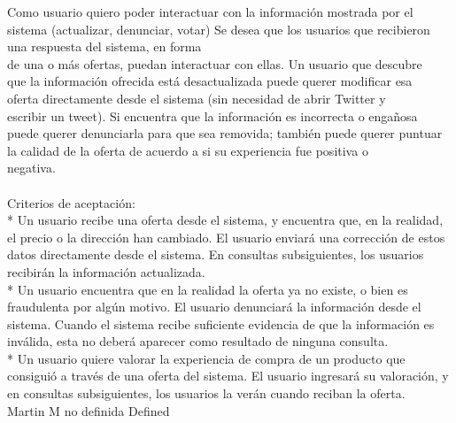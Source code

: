 	{Como usuario quiero poder interactuar con la información mostrada por el sistema (actualizar, denunciar, votar)} %
	{Se desea que los usuarios que recibieron una respuesta del sistema, en forma\\
de una o más ofertas, puedan interactuar con ellas. Un usuario que descubre\\
que la información ofrecida está desactualizada puede querer modificar esa\\
oferta directamente desde el sistema (sin necesidad de abrir Twitter y\\
escribir un tweet). Si encuentra que la información es incorrecta o engañosa\\
puede querer denunciarla para que sea removida; también puede querer puntuar\\
la calidad de la oferta de acuerdo a si su experiencia fue positiva o\\
negativa.\\
  \\
Criterios de aceptación:\\
* Un usuario recibe una oferta desde el sistema, y encuentra que, en la realidad, el precio o la dirección han cambiado. El usuario enviará una corrección de estos datos directamente desde el sistema. En consultas subsiguientes, los usuarios recibirán la información actualizada.  \\
* Un usuario encuentra que en la realidad la oferta ya no existe, o bien es fraudulenta por algún motivo. El usuario denunciará la información desde el sistema. Cuando el sistema recibe suficiente evidencia de que la información es inválida, esta no deberá aparecer como resultado de ninguna consulta.  \\
* Un usuario quiere valorar la experiencia de compra de un producto que consiguió a través de una oferta del sistema. El usuario ingresará su valoración, y en consultas subsiguientes, los usuarios la verán cuando reciban la oferta.\\
} %
	{} %
	{} %
	{Martin M} %
	{no definida} %
	{Defined} %


\vspace{20pt}

